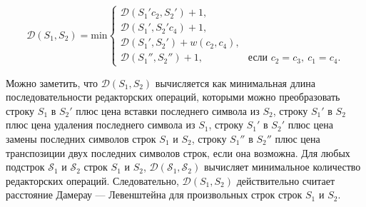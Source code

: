 \begin{enumerate}
$$    \mathcal{D}(S_1, S_2) = \mathrm{min} \begin{cases}
        \mathcal{D}(S_1'c_2, S_2') + 1, \\
        \mathcal{D}(S_1', S_2'c_4) + 1, \\
        \mathcal{D}(S_1', S_2') + w(c_2, c_4), \\
        \mathcal{D}(S_1'', S_2'') + 1,\ &\text{если $c_2 = c_3,\ c_1 = c_4$}.
    \end{cases}
        $$
\end{enumerate}

Можно заметить, что $\mathcal{D}(S_1, S_2)$ вычисляется как минимальная длина последовательности редакторских операций, которыми можно преобразовать строку $S_1$ в $S_2'$ плюс цена вставки последнего символа из $S_2$, строку $S_1'$ в $S_2$ плюс цена удаления последнего символа из $S_1$, строку $S_1'$ в $S_2'$ плюс цена замены последних символов строк $S_1$ и $S_2$, строку $S_1''$ в $S_2''$ плюс цена транспозиции двух последних символов строк, если она возможна.
Для любых подстрок $\mathcal{S}_1$ и $\mathcal{S}_2$ строк $S_1$ и $S_2$, $\mathcal{D}(\mathcal{S}_1, \mathcal{S}_2)$ вычисляет минимальное количество редакторских операций.
Следовательно, $\mathcal{D}(S_1, S_2)$ действительно считает расстояние Дамерау --- Левенштейна для произвольных строк строк $S_1$ и $S_2$.

